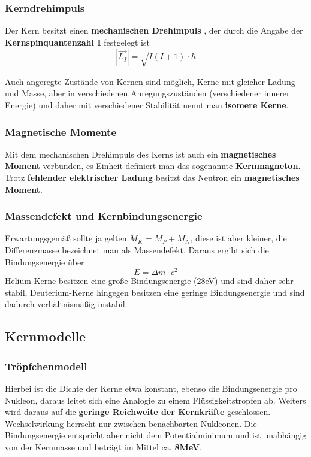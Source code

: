 \documentclass[12pt,a4paper,ngerman]{article}
\begin{document}
\subsubsection*{Kerndrehimpuls}
Der Kern besitzt einen \textbf{mechanischen Drehimpuls }, der durch die Angabe der \textbf{Kernspinquantenzahl I} festgelegt ist
\begin{equation}
|\vec{L_I}| = \sqrt{I(I+1)}\cdot \hbar
\end{equation}

Auch angeregte Zustände von Kernen sind möglich, Kerne mit gleicher Ladung und Masse, aber in verschiedenen Anregungszuständen (verschiedener innerer Energie) und daher mit verschiedener Stabilität nennt man \textbf{isomere Kerne}. 

\subsubsection*{Magnetische Momente}

Mit dem mechanischen Drehimpuls des Kerns ist auch ein \textbf{magnetisches Moment} verbunden, es Einheit definiert man das sogenannte \textbf{Kernmagneton}. Trotz \textbf{fehlender elektrischer Ladung} besitzt das Neutron ein \textbf{magnetisches Moment}. 

\subsubsection*{Massendefekt und Kernbindungsenergie} 
Erwartungsgemäß sollte ja gelten $M_K = M_P + M_N$, diese ist aber kleiner, die Differenzmasse bezeichnet man als Massendefekt. Daraus ergibt sich die Bindungsenergie über 
\begin{equation}
E = \Delta m \cdot c^2
\end{equation}
Helium-Kerne besitzen eine große Bindungsenergie (28eV) und sind daher sehr stabil, Deuterium-Kerne hingegen besitzen eine geringe Bindungsenergie und sind dadurch verhältnismäßig instabil. 


\subsection{Kernmodelle}
\subsubsection*{Tröpfchenmodell}

Hierbei ist die Dichte der Kerne etwa konstant, ebenso die Bindungsenergie pro Nukleon, daraus leitet sich eine Analogie zu einem Flüssigkeitstropfen ab. Weiters wird daraus auf die \textbf{geringe Reichweite der Kernkräfte} geschlossen. Wechselwirkung herrscht nur zwischen benachbarten Nukleonen. Die Bindungsenergie entspricht aber nicht dem Potentialminimum und ist unabhängig von der Kernmasse und beträgt im Mittel ca. \textbf{8MeV}.  
\end{document}
